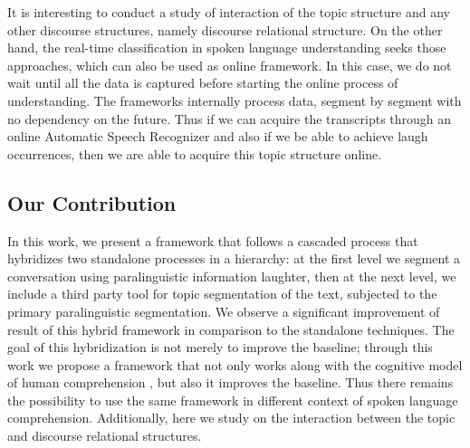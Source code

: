 \documentclass{article}
\begin{document}
It is interesting to conduct a study of interaction of the topic structure and any other discourse structures, namely discourse relational structure. On the other hand, the real-time classification in spoken language understanding seeks those approaches, which can also be used as online framework. In this case, we do not wait until all the data is captured before starting the online process of understanding. The frameworks internally process data, segment by segment with no dependency on the future. Thus if we can acquire the transcripts through an online Automatic Speech Recognizer \cite{kaldionline16} and also if we be able to achieve laugh occurrences\cite{salamin13,schuller13,ghosh16}, then we are able to acquire this topic structure online. %


\subsection{Our Contribution}\label{sec:cont} 
In this work, we present a framework that follows a cascaded process that hybridizes two standalone processes in a hierarchy: at the first level we segment a conversation using paralinguistic information laughter, then at the next level, we include a third party tool for topic segmentation of the text, subjected to the primary paralinguistic segmentation. We observe a significant improvement of result of this hybrid framework in comparison to the standalone techniques. The goal of this hybridization is not merely to improve the baseline; through this work we propose a framework that not only works along with the cognitive model of human comprehension \cite{bower-85}, but also it improves the baseline. Thus there remains the possibility to use the same framework in different context of spoken language comprehension. Additionally, here we study on the interaction between the topic and discourse relational structures. 
\end{document}
